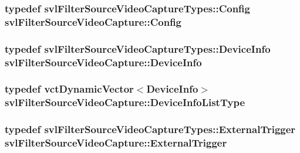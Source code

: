 \subsubsection[{Config}]{\setlength{\rightskip}{0pt plus 5cm}typedef svl\+Filter\+Source\+Video\+Capture\+Types\+::\+Config {\bf svl\+Filter\+Source\+Video\+Capture\+::\+Config}}\label{classsvl_filter_source_video_capture_ac541a625ce316b5320170cef3ca02277}
\hypertarget{classsvl_filter_source_video_capture_ad656487fb2deec890dc39764152b8f8b}{}
\subsubsection[{Device\+Info}]{\setlength{\rightskip}{0pt plus 5cm}typedef svl\+Filter\+Source\+Video\+Capture\+Types\+::\+Device\+Info {\bf svl\+Filter\+Source\+Video\+Capture\+::\+Device\+Info}}\label{classsvl_filter_source_video_capture_ad656487fb2deec890dc39764152b8f8b}
\hypertarget{classsvl_filter_source_video_capture_a52d28d8296c6b85055022a72c69334e4}{}
\subsubsection[{Device\+Info\+List\+Type}]{\setlength{\rightskip}{0pt plus 5cm}typedef {\bf vct\+Dynamic\+Vector}$<${\bf Device\+Info}$>$ {\bf svl\+Filter\+Source\+Video\+Capture\+::\+Device\+Info\+List\+Type}}\label{classsvl_filter_source_video_capture_a52d28d8296c6b85055022a72c69334e4}
\hypertarget{classsvl_filter_source_video_capture_a609a8eb75ea23b7b35068207cc3c3144}{}
\subsubsection[{External\+Trigger}]{\setlength{\rightskip}{0pt plus 5cm}typedef svl\+Filter\+Source\+Video\+Capture\+Types\+::\+External\+Trigger {\bf svl\+Filter\+Source\+Video\+Capture\+::\+External\+Trigger}}\label{classsvl_filter_source_video_capture_a609a8eb75ea23b7b35068207cc3c3144}
\hypertarget{classsvl_filter_source_video_capture_af6d31bdf8807755322cd7e5ef1f0d8d9}{}

